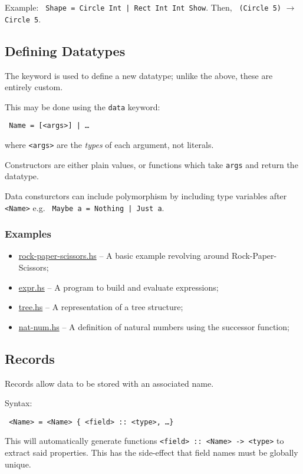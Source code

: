 Example: \texttt{ Shape = Circle Int | Rect Int Int  Show}. Then, \texttt{ (Circle 5)} $\rightarrow$ \texttt{Circle 5}.

\subsection{Defining Datatypes}
The  keyword is used to define a new datatype; unlike the above, these are entirely custom.

This may be done using the \texttt{data} keyword:
\begin{center}
  \texttt{ Name =  [<args>] | \ldots}
\end{center}
where \texttt{<args>} are the \textit{types} of each argument, not literals.

Constructors are either plain values, or functions which take \texttt{args} and return the datatype.

Data consturctors can include polymorphism by including type variables after \texttt{<Name>} e.g. \texttt{ Maybe a = Nothing | Just a}.

\subsubsection{Examples}
\begin{itemize}
  \item \url{rock-paper-scissors.hs} -- A basic example revolving around Rock-Paper-Scissors;
  \item \url{expr.hs} -- A program to build and evaluate expressions;
  \item \url{tree.hs} -- A representation of a tree structure;
  \item \url{nat-num.hs} -- A definition of natural numbers using the successor function;
\end{itemize}

\subsection{Records}
Records allow data to be stored with an associated name.

Syntax:
\begin{center}
  \texttt{ <Name> = <Name> \{ <field> :: <type>, \ldots \}}
\end{center}
This will automatically generate functions \texttt{<field> :: <Name> -> <type>} to extract said properties. This has the side-effect that field names must be globally unique.

